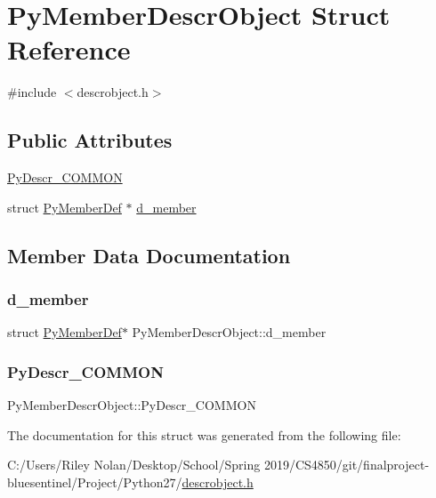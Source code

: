 \hypertarget{struct_py_member_descr_object}{}\section{Py\+Member\+Descr\+Object Struct Reference}
\label{struct_py_member_descr_object}


{\ttfamily \#include $<$descrobject.\+h$>$}

\subsection*{Public Attributes}
\begin{DoxyCompactItemize}
\item 
\mbox{\hyperlink{struct_py_member_descr_object_a7b959892ce5a401b22c67e3c5162bee0}{Py\+Descr\+\_\+\+C\+O\+M\+M\+ON}}
\item 
struct \mbox{\hyperlink{struct_py_member_def}{Py\+Member\+Def}} $\ast$ \mbox{\hyperlink{struct_py_member_descr_object_a3169c9bdd945c9cf780b3940d3300387}{d\+\_\+member}}
\end{DoxyCompactItemize}


\subsection{Member Data Documentation}
\mbox{\label{struct_py_member_descr_object_a3169c9bdd945c9cf780b3940d3300387}} 
\subsubsection{\texorpdfstring{d\_member}{d\_member}}
{\footnotesize\ttfamily struct \mbox{\hyperlink{struct_py_member_def}{Py\+Member\+Def}}$\ast$ Py\+Member\+Descr\+Object\+::d\+\_\+member}

\mbox{\label{struct_py_member_descr_object_a7b959892ce5a401b22c67e3c5162bee0}} 
\subsubsection{\texorpdfstring{PyDescr\_COMMON}{PyDescr\_COMMON}}
{\footnotesize\ttfamily Py\+Member\+Descr\+Object\+::\+Py\+Descr\+\_\+\+C\+O\+M\+M\+ON}



The documentation for this struct was generated from the following file\+:\begin{DoxyCompactItemize}
\item 
C\+:/\+Users/\+Riley Nolan/\+Desktop/\+School/\+Spring 2019/\+C\+S4850/git/finalproject-\/bluesentinel/\+Project/\+Python27/\mbox{\hyperlink{descrobject_8h}{descrobject.\+h}}\end{DoxyCompactItemize}
